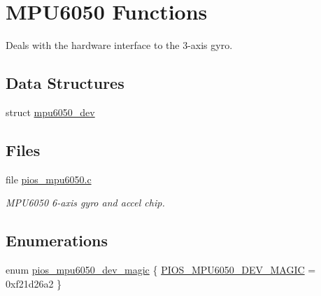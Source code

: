 \hypertarget{group___p_i_o_s___m_p_u6050}{\section{\-M\-P\-U6050 \-Functions}
\label{group___p_i_o_s___m_p_u6050}
}


\-Deals with the hardware interface to the 3-\/axis gyro.  


\subsection*{\-Data \-Structures}
\begin{DoxyCompactItemize}
\item 
struct \hyperlink{structmpu6050__dev}{mpu6050\-\_\-dev}
\end{DoxyCompactItemize}
\subsection*{\-Files}
\begin{DoxyCompactItemize}
\item 
file \hyperlink{pios__mpu6050_8c}{pios\-\_\-mpu6050.\-c}
\begin{DoxyCompactList}\small\item\em \-M\-P\-U6050 6-\/axis gyro and accel chip. \end{DoxyCompactList}\end{DoxyCompactItemize}
\subsection*{\-Enumerations}
\begin{DoxyCompactItemize}
\item 
enum \hyperlink{group___p_i_o_s___m_p_u6050_ga22a9ad4120542ed164b6afe9b094b6f3}{pios\-\_\-mpu6050\-\_\-dev\-\_\-magic} \{ \hyperlink{group___p_i_o_s___m_p_u6050_gga22a9ad4120542ed164b6afe9b094b6f3ab2ce219069f414a9b51976c869c1c3b6}{\-P\-I\-O\-S\-\_\-\-M\-P\-U6050\-\_\-\-D\-E\-V\-\_\-\-M\-A\-G\-I\-C} =  0xf21d26a2
 \}
\end{DoxyCompactItemize}
